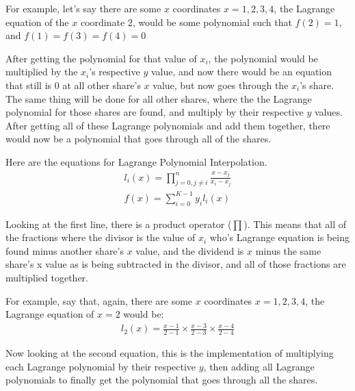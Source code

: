\documentclass[15pt]{article}
\begin{document}
\begin{flushleft}
For example, let's say there are some $x$ coordinates $x=1,2,3,4$, the Lagrange
equation of the $x$ coordinate $2$, would be some polynomial such that $f(2)=1$,
and $f(1)=f(3)=f(4)=0$

After getting the polynomial for that value of $x_i$, the polynomial would be
multiplied by the $x_i$'s respective $y$ value, and now there would be an
equation that still is $0$ at all other share's $x$ value, but now goes through
the $x_i$'s share. The same thing will be done for all other shares, where the
the Lagrange polynomial for those shares are found, and multiply by their 
respective $y$ values. After getting all of these Lagrange polynomials and add
them together, there would now be a polynomial that goes through all of the 
shares.

Here are the equations for Lagrange Polynomial Interpolation.
\begin{align*}
 l_{i}(x) = \prod_{j=0, j\neq i}^{n} \frac{x-x_{j}}{x_{i}-x_{j}} \\
 f(x) = \sum_{i=0}^{K-1} y_{i}l_{i}(x)
\end{align*}

Looking at the first line, there is a product operator ($\prod$). This means
that all of the fractions where the divisor is the value of $x_i$ who's Lagrange
equation is being found minus another share's $x$ value, and the dividend is
$x$ minus the same share's x value as is being subtracted in the divisor, and
all of those fractions are multiplied together.

For example, say that, again, there are some $x$ coordinates $x=1,2,3,4$, the
Lagrange equation of $x=2$ would be:
\begin{align*}
 l_2(x) = \frac{x-1}{2-1} \times \frac{x-3}{2-3} \times \frac{x-4}{2-4}
\end{align*}

Now looking at the second equation, this is the implementation of multiplying
each Lagrange polynomial by their respective $y$, then adding all Lagrange
polynomials to finally get the polynomial that goes through all the shares.


\end{flushleft}
\end{document}
